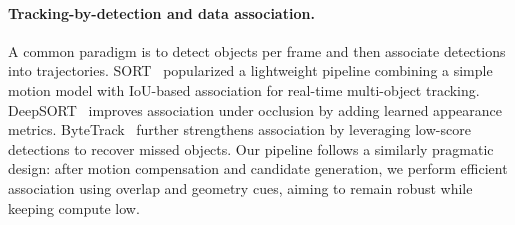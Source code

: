 \paragraph{Tracking-by-detection and data association.}
A common paradigm is to detect objects per frame and then associate detections into trajectories.
SORT~\cite{bewley2016sort} popularized a lightweight pipeline combining a simple motion model with IoU-based association for real-time multi-object tracking.
DeepSORT~\cite{wojke2017deepsort} improves association under occlusion by adding learned appearance metrics.
ByteTrack~\cite{zhang2022bytetrack} further strengthens association by leveraging low-score detections to recover missed objects.
Our pipeline follows a similarly pragmatic design: after motion compensation and candidate generation, we perform efficient association using overlap and geometry cues, aiming to remain robust while keeping compute low.

